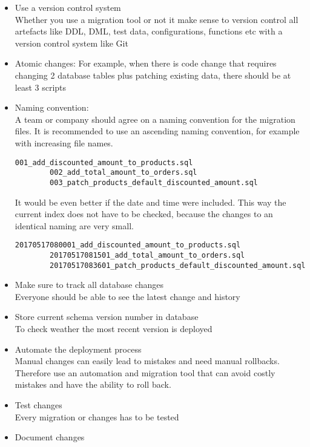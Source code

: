 \begin{itemize}
	\item Use a version control system\\
	Whether you use a migration tool or not it make sense to version control all artefacts like DDL, DML, test data, configurations, functions etc with a version control system like Git
	\item Atomic changes: For example, when there is code change that requires changing 2 database tables plus patching existing data, there should be at least 3 scripts
	\item Naming convention: \\
	A team or company should agree on a naming convention for the migration files. It is recommended to use an ascending naming convention, for example with increasing file names.
	\begin{lstlisting}[caption=Increasing file names]
		001_add_discounted_amount_to_products.sql
		002_add_total_amount_to_orders.sql
		003_patch_products_default_discounted_amount.sql
	\end{lstlisting}
	
	It would be even better if the date and time were included. This way the current index does not have to be checked, because the changes to an identical naming are very small.
	\begin{lstlisting}[caption=Timestamps]
		20170517080001_add_discounted_amount_to_products.sql
		20170517081501_add_total_amount_to_orders.sql
		20170517083601_patch_products_default_discounted_amount.sql
	\end{lstlisting}
	\item Make sure to track all database changes\\
	Everyone should be able to see the latest change and history
	\item Store current schema version number in database\\
	To check weather the most recent version is deployed
	\item Automate the deployment process\\
	Manual changes can easily lead to mistakes and need manual rollbacks. Therefore use an automation and migration tool that can avoid costly mistakes and have the ability to roll back.
	\item Test changes\\
	Every migration or changes has to be tested
	\item Document changes 
\end{itemize}

